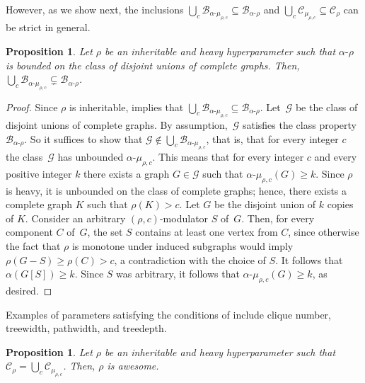 \documentclass[11pt]{article}
\newcommand{\rhocm}{\mu_{\rho,c}}
\theoremstyle{plain}
\newtheorem{proposition}[theorem]{Proposition}
\theoremstyle{definition}
\theoremstyle{remark}
\numberwithin{equation}{section}
\begin{document}
However, as we show next, the inclusions $\bigcup_{c}\mathcal{B}_{\alpha\text{-}\rhocm}\subseteq \mathcal{B}_{\alpha\text{-}\rho}$ and $\bigcup_{c}\mathcal{C}_{\rhocm}\subseteq \mathcal{C}_{\rho}$ can be strict in general.

\begin{proposition}\label{prop:alpha-mu-rho-c-bounded-strict}
Let $\rho$ be an inheritable and heavy hyperparameter such that $\alpha\text{-}\rho$ is bounded on the class of disjoint unions of complete graphs.
Then, ${\bigcup_{c}\mathcal{B}_{\alpha\text{-}\rhocm}\subsetneq \mathcal{B}_{\alpha\text{-}\rho}}$.
\end{proposition}

\begin{proof}
Since $\rho$ is inheritable,  implies that ${\bigcup_{c}\mathcal{B}_{\alpha\text{-}\rhocm}\subseteq \mathcal{B}_{\alpha\text{-}\rho}}$.
Let~$\mathcal{G}$ be the class of disjoint unions of complete graphs.
By assumption,~$\mathcal{G}$ satisfies the class property $\mathcal{B}_{\alpha\text{-}\rho}$.
So it suffices to show that $\mathcal{G}\not\in \bigcup_{c}\mathcal{B}_{\alpha\text{-}\rhocm}$, that is, that for every integer $c$ the class~$\mathcal{G}$ has unbounded $\alpha\text{-}\rhocm$.
This means that for every integer $c$ and every positive integer $k$ there exists a graph $G\in \mathcal{G}$ such that $\alpha\text{-}\rhocm(G)\ge k$.
Since $\rho$ is heavy, it is unbounded on the class of complete graphs; hence, there exists a complete graph $K$ such that $\rho(K)>c$. 
Let $G$ be the disjoint union of $k$ copies of $K$.
Consider an arbitrary $(\rho,c)$-modulator $S$ of~$G$.
Then, for every component $C$ of~$G$, the set $S$ contains at least one vertex from $C$, since otherwise the fact that $\rho$ is monotone under induced subgraphs would imply $\rho(G-S)\ge \rho(C)>c$, a contradiction with the choice of $S$.
It follows that $\alpha(G[S])\ge k$.
Since $S$ was arbitrary, it follows that $\alpha\text{-}\rhocm(G)\ge k$, as desired.
\end{proof}

Examples of parameters satisfying the conditions of  include clique number, treewidth, pathwidth, and treedepth.

\begin{proposition}\label{prop:clique-bounded-strict}
Let $\rho$ be an inheritable and heavy hyperparameter such that $\mathcal{C}_{\rho} = \bigcup_{c}\mathcal{C}_{\rhocm}$.
Then, $\rho$ is awesome.
\end{proposition}
\end{document}
